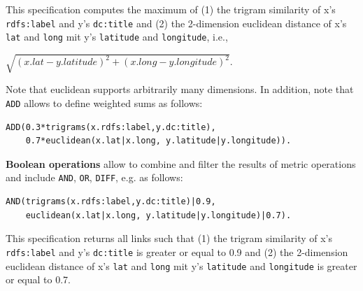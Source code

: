 \documentclass[a4paper, 11pt]{article}
\begin{document}
This specification computes the maximum of (1) the trigram similarity of x's \texttt{rdfs:label} and y's \texttt{dc:title} and (2) the 2-dimension euclidean distance of x's \texttt{lat} and \texttt{long} mit y's \texttt{latitude} and \texttt{longitude}, i.e., 

$\sqrt{(x.lat- y.latitude)^2 + (x.long - y.longitude)^2}$. 

Note that euclidean supports arbitrarily many dimensions. In addition, note that \texttt{ADD} allows to define weighted sums as follows:

\begin{ttfamily}
\begin{lstlisting}[language=XML,basicstyle=\scriptsize,numberstyle=\tiny]
ADD(0.3*trigrams(x.rdfs:label,y.dc:title), 
    0.7*euclidean(x.lat|x.long, y.latitude|y.longitude)).
\end{lstlisting}
\end{ttfamily}

\textbf{Boolean operations} allow to combine and filter the results of metric operations and include \texttt{AND}, \texttt{OR}, \texttt{DIFF}, e.g. as follows:

\begin{ttfamily}
\begin{lstlisting}[language=XML,basicstyle=\scriptsize,numberstyle=\tiny]
AND(trigrams(x.rdfs:label,y.dc:title)|0.9,
    euclidean(x.lat|x.long, y.latitude|y.longitude)|0.7).
\end{lstlisting}
\end{ttfamily}

This specification returns all links such that (1) the trigram similarity of x's \texttt{rdfs:label} and y's \texttt{dc:title} is greater or equal to 0.9 and (2) the 2-dimension euclidean distance of x's \texttt{lat} and \texttt{long} mit y's \texttt{latitude} and \texttt{longitude} is greater or equal to 0.7.
\end{document}
